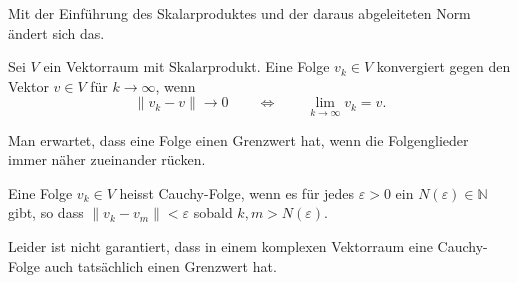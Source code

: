 Mit der Einführung des Skalarproduktes und der daraus abgeleiteten Norm
ändert sich das.
\begin{definition}
Sei $V$ ein Vektorraum mit Skalarprodukt.
Eine Folge $v_k\in V$ konvergiert gegen den Vektor $v\in V$ für $k\to\infty$,
wenn
\[
\| v_k - v\| \to  0 
\qquad\Leftrightarrow\qquad
\lim_{k\to\infty} v_k = v.
\]
\end{definition}

Man erwartet, dass eine Folge einen Grenzwert hat, wenn die Folgenglieder
immer näher zu\-ei\-nan\-der rücken.

\begin{definition}
Eine Folge $v_k\in V$ heisst Cauchy-Folge, wenn es für jedes $\varepsilon > 0$
ein $N(\varepsilon)\in\mathbb N$ gibt, so dass
$\|v_k - v_m\| < \varepsilon$
sobald $k,m>N(\varepsilon)$.
\end{definition}

Leider ist nicht garantiert, dass in einem komplexen Vektorraum eine
Cauchy-Folge auch tatsächlich einen Grenzwert hat.

